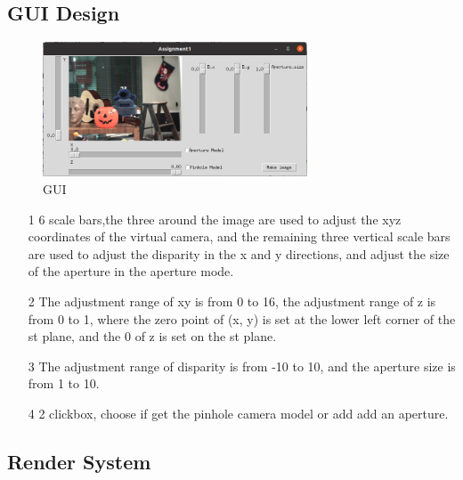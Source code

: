 \documentclass[letterpaper,12pt]{article}
\begin{document}
\subsection{GUI Design}
\begin{figure}[h]
	\centering 
	\includegraphics[width=0.7\textwidth]{Image/Gui.png}
	\caption{GUI}
\end{figure}
\begin{itemize}
	\item[1] 6 scale bars,the three around the image are used to adjust the xyz coordinates of the virtual camera, and the remaining three vertical scale bars are used to adjust the disparity in the x and y directions, and adjust the size of the aperture in the aperture mode.
	\item[2] 
	The adjustment range of xy is from 0 to 16, the adjustment range of z is from 0 to 1, where the zero point of (x, y) is set at the lower left corner of the st plane, and the 0 of z is set on the st plane.
	\item[3]
	The adjustment range of disparity is from -10 to 10, and the aperture size is from 1 to 10.
	\item[4]
	2 clickbox, choose if get the pinhole camera model or add add an aperture.
\end{itemize}

\subsection{Render System}
\end{document}
